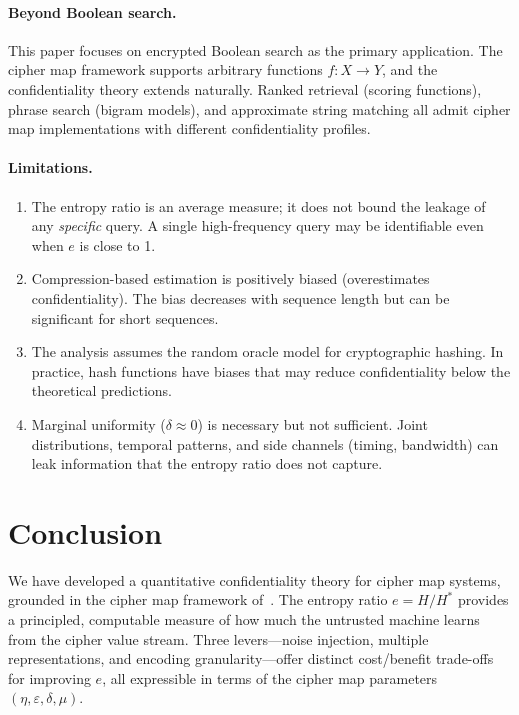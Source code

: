 \documentclass[11pt]{article}
\theoremstyle{definition}
\theoremstyle{plain}
\theoremstyle{remark}
\begin{document}
\paragraph{Beyond Boolean search.}
This paper focuses on encrypted Boolean search as the primary
application.  The cipher map framework supports arbitrary functions
$f : X \to Y$, and the confidentiality theory extends naturally.  Ranked
retrieval (scoring functions), phrase search (bigram models), and
approximate string matching all admit cipher map implementations with
different confidentiality profiles.

\paragraph{Limitations.}
\begin{enumerate}
\item The entropy ratio is an average measure; it does not bound the
  leakage of any \emph{specific} query.  A single high-frequency query
  may be identifiable even when $e$ is close to 1.

\item Compression-based estimation is positively biased (overestimates
  confidentiality).  The bias decreases with sequence length but can be
  significant for short sequences.

\item The analysis assumes the random oracle model for cryptographic
  hashing.  In practice, hash functions have biases that may reduce
  confidentiality below the theoretical predictions.

\item Marginal uniformity ($\delta \approx 0$) is necessary but not
  sufficient.  Joint distributions, temporal patterns, and side channels
  (timing, bandwidth) can leak information that the entropy ratio does
  not capture.
\end{enumerate}


\section{Conclusion}
\label{sec:conclusion}

We have developed a quantitative confidentiality theory for cipher map
systems, grounded in the cipher map framework
of~\cite{towell2026cipher}.  The entropy ratio $e = H/H^*$ provides a
principled, computable measure of how much the untrusted machine learns
from the cipher value stream.  Three levers---noise injection, multiple
representations, and encoding granularity---offer distinct cost/benefit
trade-offs for improving $e$, all expressible in terms of the cipher map
parameters $(\eta, \varepsilon, \delta, \mu)$.
\end{document}
